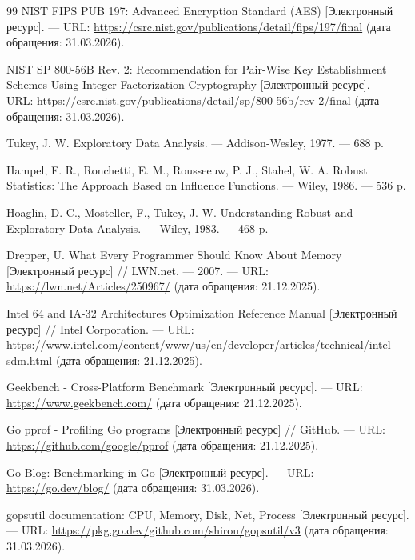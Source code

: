\begin{thebibliography}{99}
NIST FIPS PUB 197: Advanced Encryption Standard (AES) [Электронный ресурс]. — URL: \url{https://csrc.nist.gov/publications/detail/fips/197/final} (дата обращения: 31.03.2026).

NIST SP 800-56B Rev. 2: Recommendation for Pair-Wise Key Establishment Schemes Using Integer Factorization Cryptography [Электронный ресурс]. — URL: \url{https://csrc.nist.gov/publications/detail/sp/800-56b/rev-2/final} (дата обращения: 31.03.2026).

Tukey, J. W. Exploratory Data Analysis. — Addison-Wesley, 1977. — 688 p.

Hampel, F. R., Ronchetti, E. M., Rousseeuw, P. J., Stahel, W. A. Robust Statistics: The Approach Based on Influence Functions. — Wiley, 1986. — 536 p.

Hoaglin, D. C., Mosteller, F., Tukey, J. W. Understanding Robust and Exploratory Data Analysis. — Wiley, 1983. — 468 p.

Drepper, U. What Every Programmer Should Know About Memory [Электронный ресурс] // LWN.net. — 2007. — URL: \url{https://lwn.net/Articles/250967/} (дата обращения: 21.12.2025).

Intel 64 and IA-32 Architectures Optimization Reference Manual [Электронный ресурс] // Intel Corporation. — URL: \url{https://www.intel.com/content/www/us/en/developer/articles/technical/intel-sdm.html} (дата обращения: 21.12.2025).

Geekbench - Cross-Platform Benchmark [Электронный ресурс]. — URL: \url{https://www.geekbench.com/} (дата обращения: 21.12.2025).

Go pprof - Profiling Go programs [Электронный ресурс] // GitHub. — URL: \url{https://github.com/google/pprof} (дата обращения: 21.12.2025).

Go Blog: Benchmarking in Go [Электронный ресурс]. — URL: \url{https://go.dev/blog/} (дата обращения: 31.03.2026).

gopsutil documentation: CPU, Memory, Disk, Net, Process [Электронный ресурс]. — URL: \url{https://pkg.go.dev/github.com/shirou/gopsutil/v3} (дата обращения: 31.03.2026).

\end{thebibliography}
